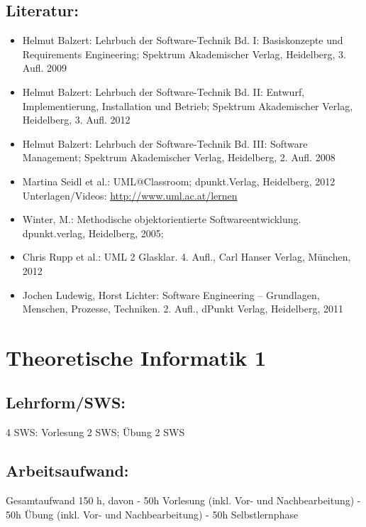 \section{Literatur:}\label{literatur-26}

\begin{itemize}
\tightlist
\item
  Helmut Balzert: Lehrbuch der Software-Technik Bd. I: Basiskonzepte und
  Requirements Engineering; Spektrum Akademischer Verlag, Heidelberg, 3.
  Aufl. 2009
\item
  Helmut Balzert: Lehrbuch der Software-Technik Bd. II: Entwurf,
  Implementierung, Installation und Betrieb; Spektrum Akademischer
  Verlag, Heidelberg, 3. Aufl. 2012
\item
  Helmut Balzert: Lehrbuch der Software-Technik Bd. III: Software
  Management; Spektrum Akademischer Verlag, Heidelberg, 2. Aufl. 2008
\item
  Martina Seidl et al.: UML@Classroom; dpunkt.Verlag, Heidelberg, 2012
  Unterlagen/Videos: \url{http://www.uml.ac.at/lernen}
\item
  Winter, M.: Methodische objektorientierte Softwareentwicklung.
  dpunkt.verlag, Heidelberg, 2005;
\item
  Chris Rupp et al.: UML 2 Glasklar. 4. Aufl., Carl Hanser Verlag,
  München, 2012
\item
  Jochen Ludewig, Horst Lichter: Software Engineering -- Grundlagen,
  Menschen, Prozesse, Techniken. 2. Aufl., dPunkt Verlag, Heidelberg,
  2011
\end{itemize}

\chapter{Theoretische Informatik 1}\label{theoretische-informatik-1}

\section{Lehrform/SWS:}\label{lehrformsws-27}

4 SWS: Vorlesung 2 SWS; Übung 2 SWS

\section{Arbeitsaufwand:}\label{arbeitsaufwand-26}

Gesamtaufwand 150 h, davon - 50h Vorlesung (inkl. Vor- und
Nachbearbeitung) - 50h Übung (inkl. Vor- und Nachbearbeitung) - 50h
Selbstlernphase

